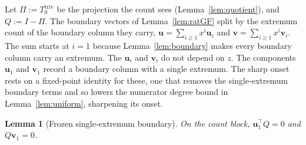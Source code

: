 \documentclass[11pt]{article}
\newtheorem{lemma}[theorem]{Lemma}
\theoremstyle{definition}
\theoremstyle{remark}
\begin{document}
Let $\Pi:=T_0^{\mathrm{triv}}$ be the projection the count sees
(Lemma~\ref{lem:quotient}), and $Q:=I-\Pi$. The boundary
vectors of Lemma~\ref{lem:ratGF} split by the extremum count of the boundary column they
carry, $\mathbf u=\sum_{i\ge1}x^i\mathbf u_i$ and
$\mathbf v=\sum_{i\ge1}x^i\mathbf v_i$. The sum starts at $i=1$ because
Lemma~\ref{lem:boundary} makes every boundary column carry an extremum. The
$\mathbf u_i$ and $\mathbf v_i$ do not depend on $z$. The components $\mathbf u_1$ and
$\mathbf v_1$ record a boundary column with a single extremum. The sharp onset
rests on a fixed-point identity for these, one that removes the single-extremum
boundary terms and so lowers the numerator degree bound in
Lemma~\ref{lem:uniform}, sharpening its onset.

\begin{lemma}[Frozen single-extremum boundary]\label{lem:frozenbdy}
On the count block, $\mathbf u_1^{\!\top}Q=0$ and $Q\mathbf v_1=0$.
\end{lemma}
\end{document}
